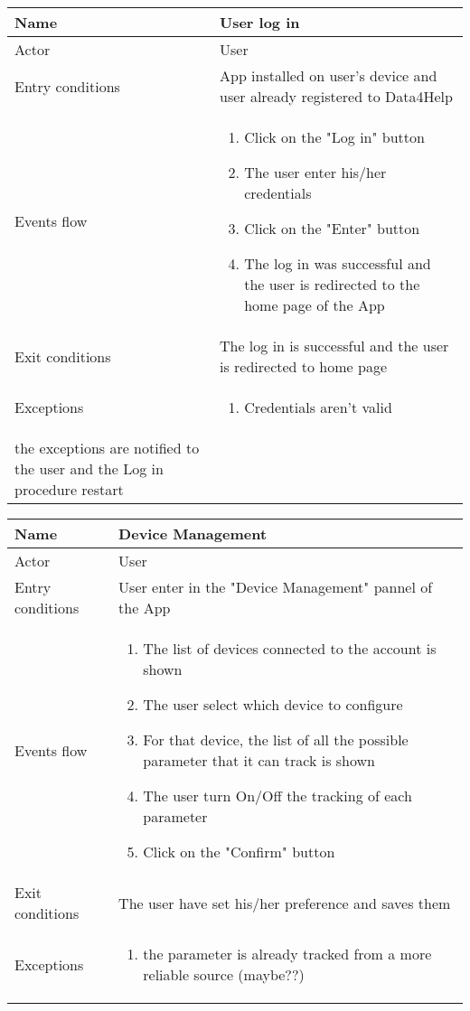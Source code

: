 \begin{table}[]
\begin{tabular}{|l|l|}
\hline
Name             & User log in \\ \hline
Actor            & User \\ \hline
Entry conditions & App installed on user's device and user already registered to Data4Help \\ \hline
Events flow      & \begin{enumerate}
\item Click on the "Log in" button
\item The user enter his/her credentials
\item Click on the "Enter" button
\item The log in was successful and the user is redirected to the home page of the App
\end{enumerate} \\ \hline
Exit conditions  & The log in is successful and the user is redirected to home page \\ \hline
Exceptions       & \begin{enumerate}
\item Credentials aren't valid
\end{enumerate} \\ the exceptions are notified to the user and the Log in procedure restart \hline
\end{tabular}
\end{table}

\begin{table}[]
\begin{tabular}{|l|l|}
\hline
Name             & Device Management \\ \hline
Actor            & User \\ \hline
Entry conditions & User enter in the "Device Management" pannel of the App \\ \hline
Events flow      & \begin{enumerate}
\item The list of devices connected to the account is shown
\item The user select which device to configure
\item For that device, the list of all the possible parameter that it can track is shown
\item The user turn On/Off the tracking of each parameter
\item Click on the "Confirm" button
\end{enumerate} \\ \hline
Exit conditions  & The user have set his/her preference and saves them \\ \hline
Exceptions       & \begin{enumerate}
\item the parameter is already tracked from a more reliable source (maybe??)
\end{enumerate} \\ \hline
\end{tabular}
\end{table}

